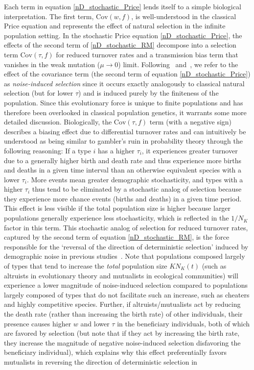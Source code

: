 Each term in equation \eqref{nD_stochastic_Price} lends itself to a simple biological interpretation. The first term, $\textrm{Cov}(w,f)$, is well-understood in the classical Price equation and represents the effect of natural selection in the infinite population setting. In the stochastic Price equation \eqref{nD_stochastic_Price}, the effects of the second term of 
\eqref{nD_stochastic_RM} decompose into a selection term $\textrm{Cov}(\tau,f)$ for reduced turnover rates and a transmission bias term that vanishes in the weak mutation ($\mu \to 0$) limit. Following~\cite{constable_demographic_2016} and~\cite{week_white_2021}, we refer to the effect of the covariance term (the second term of equation \eqref{nD_stochastic_Price}) as \emph{noise-induced selection} since it occurs exactly analogously to classical natural selection (but for lower $\tau$) and is induced purely by the finiteness of the population. Since this evolutionary force is unique to finite populations and has therefore been overlooked in classical population genetics, it warrants some more detailed discussion. Biologically, the $\textrm{Cov}(\tau,f)$ term (with a negative sign) describes a biasing effect due to differential turnover rates and can intuitively be understood as being similar to gambler's ruin in probability theory through the following reasoning: If a type $i$ has a higher $\tau_i$, it experiences greater turnover due to a generally higher birth and death rate and thus experience more births and deaths in a given time interval than an otherwise equivalent species with a lower $\tau_i$. More events mean greater demographic stochasticity, and types with a higher $\tau_i$ thus tend to be eliminated by a stochastic analog of selection because they experience more chance events (births and deaths) in a given time period. This effect is less visible if the total population size is higher because larger populations generally experience less stochasticity, which is reflected in the $1/N_K$ factor in this term. This stochastic analog of selection for reduced turnover rates, captured by the second term of equation \eqref{nD_stochastic_RM}, is the force responsible for the `reversal of the direction of deterministic selection' induced by demographic noise in previous studies~\citep{houchmandzadeh_selection_2012, houchmandzadeh_fluctuation_2015, constable_demographic_2016, mcleod_social_2019}. Note that populations composed largely of types that tend to increase the \emph{total} population size $KN_K(t)$ (such as altruists in evolutionary theory and mutualists in ecological communities) will experience a lower magnitude of noise-induced selection compared to populations largely composed of types that do not facilitate such an increase, such as cheaters and highly competitive species. Further, if altruists/mutualists act by reducing the death rate (rather than increasing the birth rate) of other individuals, their presence causes higher $w$ and lower $\tau$ in the beneficiary individuals, both of which are favored by selection (but note that if they act by increasing the birth rate, they increase the magnitude of negative noise-induced selection disfavoring the beneficiary individual), which explains why this effect preferentially favors mutualists in reversing the direction of deterministic selection in 